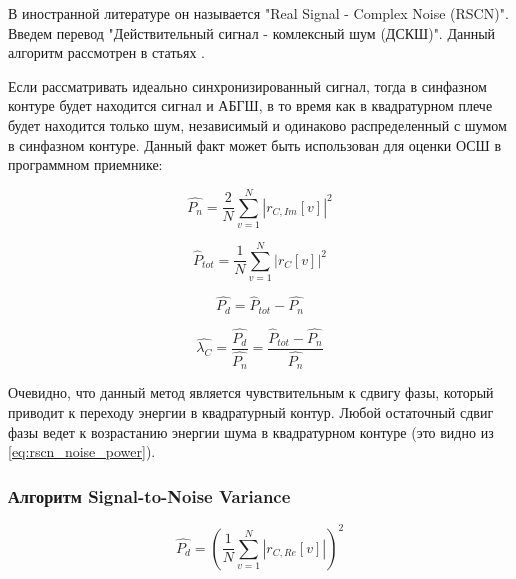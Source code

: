 В иностранной литературе он называется "Real Signal - Complex Noise (RSCN)". Введем перевод
"Действительный сигнал - комлексный шум (ДСКШ)".
Данный алгоритм рассмотрен в статьях \cite{badke_rscn, presti_insidegnss, presti_ieee}.

Если рассматривать идеально синхронизированный сигнал, тогда в синфазном контуре будет
находится сигнал и АБГШ, в то время как в квадратурном плече будет находится только шум,
независимый и одинаково распределенный с шумом в синфазном контуре. Данный факт может
быть использован для оценки ОСШ в программном приемнике:
\begin{center}
\begin{equation}
	\label{eq:rscn_noise_power}
	\hat{P_n} = \frac{2}{N}\sum^N_{v=1}|r_{C,Im}[v]|^2
\end{equation}
\end{center}

\begin{center}
\begin{equation}
	\label{eq:rscn_total_power}
	\hat{P}_{tot} = \frac{1}{N}\sum^N_{v=1}|r_{C}[v]|^2
\end{equation}
\end{center}

\begin{center}
\begin{equation}
	\label{eq:rscn_data_power}
	\hat{P_d} = \hat{P}_{tot} - \hat{P_n}
\end{equation}
\end{center}

\begin{center}
\begin{equation}
	\label{eq:rscn_snr}
	\hat{\lambda_C} = \frac{\hat{P_d}}{\hat{P_n}} = \frac{\hat{P}_{tot} - \hat{P_n}}{\hat{P_n}} 
\end{equation}
\end{center}

Очевидно, что данный метод является чувствительным к сдвигу фазы, который приводит к переходу энергии
в квадратурный контур. Любой остаточный сдвиг фазы ведет к возрастанию энергии шума в квадратурном
контуре (это видно из \ref{eq:rscn_noise_power}).

\subsubsection{Алгоритм Signal-to-Noise Variance}
\begin{center}
\begin{equation}
	\hat{P_{d}} = (\frac{1}{N} \sum \limits_{v=1}^N \left| r_{C,Re}[v] \right|)^2
\end{equation}
\end{center}

